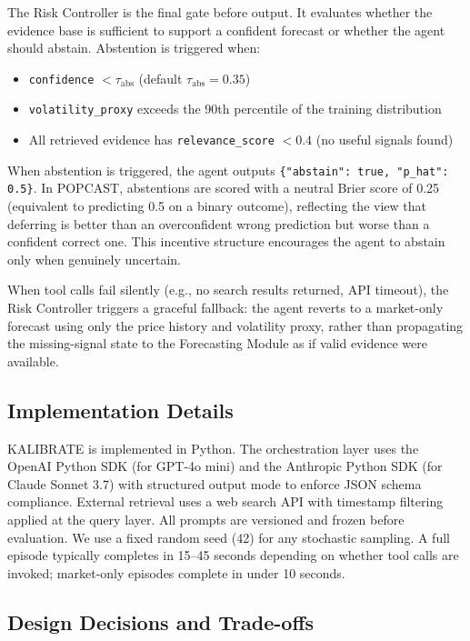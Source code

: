 \documentclass{article} %
\newcommand{\agentname}{KALIBRATE}
\newcommand{\benchmarkname}{POPCAST}
\begin{document}
The Risk Controller is the final gate before output. It evaluates whether the evidence base is sufficient to support a confident forecast or whether the agent should abstain. Abstention is triggered when:

\begin{itemize}[noitemsep]
    \item \texttt{confidence} $< \tau_{\text{abs}}$ (default $\tau_{\text{abs}} = 0.35$)
    \item \texttt{volatility\_proxy} exceeds the 90th percentile of the training distribution
    \item All retrieved evidence has \texttt{relevance\_score} $< 0.4$ (no useful signals found)
\end{itemize}

When abstention is triggered, the agent outputs \texttt{\{"abstain": true, "p\_hat": 0.5\}}. In \benchmarkname{}, abstentions are scored with a neutral Brier score of 0.25 (equivalent to predicting 0.5 on a binary outcome), reflecting the view that deferring is better than an overconfident wrong prediction but worse than a confident correct one. This incentive structure encourages the agent to abstain only when genuinely uncertain.

When tool calls fail silently (e.g., no search results returned, API timeout), the Risk Controller triggers a graceful fallback: the agent reverts to a market-only forecast using only the price history and volatility proxy, rather than propagating the missing-signal state to the Forecasting Module as if valid evidence were available.

\subsection{Implementation Details}

\agentname{} is implemented in Python. The orchestration layer uses the OpenAI Python SDK (for GPT-4o mini) and the Anthropic Python SDK (for Claude Sonnet 3.7) with structured output mode to enforce JSON schema compliance. External retrieval uses a web search API with timestamp filtering applied at the query layer. All prompts are versioned and frozen before evaluation. We use a fixed random seed (42) for any stochastic sampling. A full episode typically completes in 15--45 seconds depending on whether tool calls are invoked; market-only episodes complete in under 10 seconds.

\subsection{Design Decisions and Trade-offs}
\end{document}
